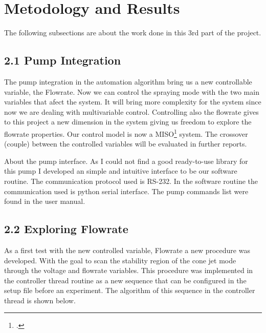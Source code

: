 \section{Metodology and Results}

    The following subsections are about the work done in this 3rd part of the project.


\subsection*{2.1 Pump Integration}

    The pump integration in the automation algorithm bring us a new controllable variable, the Flowrate. Now we can control the spraying mode with the
    two main variables that afect the system. 
    It will bring more complexity for the system since now we are dealing with multivariable control.
    Controlling also the flowrate gives to this project a new dimension in the system giving us freedom to explore the flowrate properties.
    Our control model is now a MISO\footcite{MISO: Multiple Inputs Single Output} system. The crossover (couple) between the controlled variables will be evaluated in further reports.

    About the pump interface. As I could not find a good ready-to-use library for this pump I developed an simple and intuitive interface to be our software routine.
    The communication protocol used is RS-232. In the software routine the communication used is python serial interface. The pump commands list were found in the user manual.


\subsection*{2.2 Exploring Flowrate}

    As a first test with the new controlled variable, Flowrate a new procedure was developed. With the goal to scan the stability region of the cone jet mode through the voltage and flowrate variables.
    This procedure was implemented in the controller thread routine as a new sequence that can be configured in the setup file before an experiment.
    The algorithm of this sequence in the controller thread is shown below.


